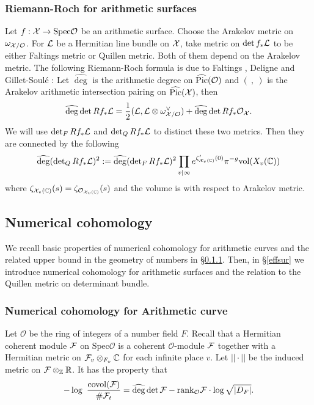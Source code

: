 \documentclass[]{amsart}
\newcommand{\BC}{{\mathbb {C}}} \newcommand{\BD}{{\mathbb {D}}}
\newcommand{\CO}{{\mathcal {O}}} \newcommand{\CP}{{\mathcal {P}}}
\newcommand{\Spec}{{\mathrm{Spec}}} \newcommand{\Spf}{{\mathrm{Spf}}}
\newcommand{\wh}{\widehat}
\newcommand{\ra}{\rightarrow} \newcommand{\imp}{\Longrightarrow}
\theoremstyle{plain}
\theoremstyle{remark} \newtheorem{remark}[thm]{Remark}
\theoremstyle{remark} \newtheorem{exercise}{Exercise}
\theoremstyle{remark} \newtheorem{example}{Example}
\numberwithin{equation}{section}
\begin{document}
\subsubsection{Riemann-Roch for arithmetic surfaces}\label{arr}
Let $f:\CX\ra \Spec\CO$ be an arithmetic surface. Choose the Arakelov metric on $\omega_{\CX/\CO}$. For ${\mathcal {L}}$ be a Hermitian line bundle on ${\mathcal {X}}$, take metric on $\det f_*{\mathcal {L}}$ to be either Faltings metric or Quillen metric. Both of them depend on the Arakelov metric.
The following Riemann-Roch formula is due to Faltings \cite{Faltings}, Deligne \cite{Deligne:85} and Gillet-Soul\'{e} \cite{Gillet-Soule}:
Let  $\wh{\deg}$ is the arithmetic degree on $\wh{\Pic}(\CO)$ and $(\ ,\ )$ is the Arakelov arithmetic intersection pairing on $\wh{\Pic}(\CX)$, then
\begin{equation}\label{arrf}\wh{\deg}\det Rf_* \CL=\frac{1}{2}(\CL,\CL\otimes\omega_{\CX/\CO}^\vee)+\wh{\deg}\det Rf_* \CO_{\CX}.\end{equation}
We will use $\det_{F} Rf_* {\mathcal {L}}$ and $\det_{Q} Rf_* {\mathcal {L}}$ to distinct these two metrics.
Then they are connected by the following \cite[Sec.~4.5]{Soule:94}
\[\wh{\deg}(\det\nolimits_{Q} Rf_*\CL)^2:=\wh{\deg}(\det\nolimits_F Rf_*\CL)^2\prod_{v|\infty}e^{\zeta_{\CX_v(\BC)}'(0)}\pi^{-g}\vol(X_v(\BC))\]where $\zeta_{\CX_v(\BC)}(s)=\zeta_{\CO_{\CX_v(\BC)}}(s)$ and the volume is with respect to Arakelov metric. 
 
 

\subsection{Numerical cohomology}
We recall basic properties of numerical cohomology for arithmetic curves and the related upper bound in the geometry of numbers in \S\ref{efco}. Then, in \S\ref{effsur} we introduce numerical cohomology for arithmetic surfaces and the relation to the Quillen metric on determinant bundle.
\subsubsection{Numerical cohomology for Arithmetic curve}\label{efco}
Let $\CO$ be the ring of integers of a number field $F$. Recall that a Hermitian coherent module ${\mathcal {F}}$ on $\Spec\CO$ is a coherent $\CO$-module ${\mathcal {F}}$ together with a Hermitian metric on $\CF_v\otimes_{F_v} \BC$ for each infinite place $v$. Let $||\cdot||$ be the induced metric on ${\mathcal {F}}\otimes_{{\mathbb {Z}}} {\mathbb {R}}$. It has the property that \[-\log\ \frac{\covol(\CF)}{\#\CF_{t}}=\wh{\deg}\det\CF-\rank_{\CO}\CF\cdot \log\sqrt{|D_F|}.\]
\end{document}
